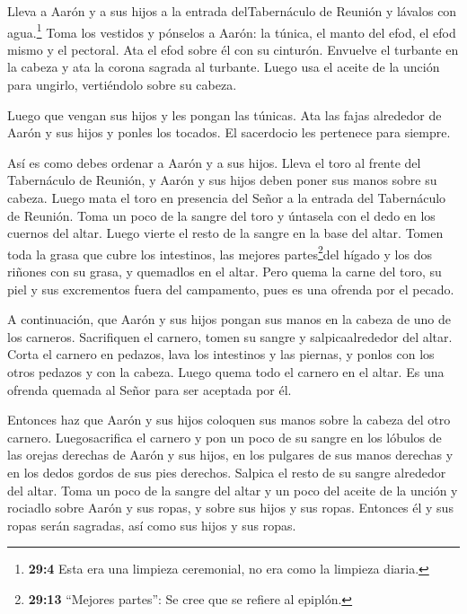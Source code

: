  Lleva a Aarón y a sus hijos a la entrada delTabernáculo de
Reunión y lávalos con agua.\footnote{\textbf{29:4} Esta era una limpieza
  ceremonial, no era como la limpieza diaria.}  Toma los
vestidos y pónselos a Aarón: la túnica, el manto del efod, el efod mismo
y el pectoral. Ata el efod sobre él con su cinturón. 
Envuelve el turbante en la cabeza y ata la corona sagrada al turbante.
 Luego usa el aceite de la unción para ungirlo, vertiéndolo
sobre su cabeza.

 Luego que vengan sus hijos y les pongan las túnicas.
 Ata las fajas alrededor de Aarón y sus hijos y ponles los
tocados. El sacerdocio les pertenece para siempre.

Así es como debes ordenar a Aarón y a sus hijos.  Lleva el
toro al frente del Tabernáculo de Reunión, y Aarón y sus hijos deben
poner sus manos sobre su cabeza.  Luego mata el toro en
presencia del Señor a la entrada del Tabernáculo de Reunión.
 Toma un poco de la sangre del toro y úntasela con el dedo
en los cuernos del altar. Luego vierte el resto de la sangre en la base
del altar.  Tomen toda la grasa que cubre los intestinos,
las mejores partes\footnote{\textbf{29:13} ``Mejores partes'': Se cree
  que se refiere al epiplón.}del hígado y los dos riñones con su grasa,
y quemadlos en el altar.  Pero quema la carne del toro, su
piel y sus excrementos fuera del campamento, pues es una ofrenda por el
pecado.

 A continuación, que Aarón y sus hijos pongan sus manos en
la cabeza de uno de los carneros.  Sacrifiquen el carnero,
tomen su sangre y salpicaalrededor del altar.  Corta el
carnero en pedazos, lava los intestinos y las piernas, y ponlos con los
otros pedazos y con la cabeza.  Luego quema todo el carnero
en el altar. Es una ofrenda quemada al Señor para ser aceptada por él.

 Entonces haz que Aarón y sus hijos coloquen sus manos
sobre la cabeza del otro carnero.  Luegosacrifica el
carnero y pon un poco de su sangre en los lóbulos de las orejas derechas
de Aarón y sus hijos, en los pulgares de sus manos derechas y en los
dedos gordos de sus pies derechos. Salpica el resto de su sangre
alrededor del altar.  Toma un poco de la sangre del altar y
un poco del aceite de la unción y rociadlo sobre Aarón y sus ropas, y
sobre sus hijos y sus ropas. Entonces él y sus ropas serán sagradas, así
como sus hijos y sus ropas.

